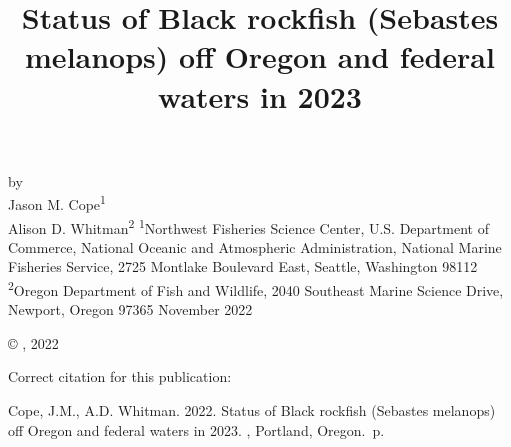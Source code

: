 \documentclass[11pt,
  english,
  letterpaper,
]{article}
\date{}
\newcommand{\trTitle}{Status of Black rockfish (Sebastes melanops) off Oregon and federal waters in 2023}
\newcommand{\trYear}{2022}
\newcommand{\trMonth}{November}
\newcommand{\trAuthsBack}{Cope, J.M., A.D. Whitman}
\newcommand{\trCitation}{
\begin{hangparas}{1em}{1}
\trAuthsBack{}. \trYear{}. \trTitle{}. \glsentrylong{pfmc}, Portland, Oregon. \pageref{LastPage}{}\,p.
\end{hangparas}}
\begin{document}

\renewcommand*{\thefootnote}{\fnsymbol{footnote}}

\small
\thispagestyle{empty}
\noindent
\begin{center}
\title{Status of Black rockfish (Sebastes melanops) off Oregon and federal waters in 2023}
\vspace{1.5cm}
{\Large\textbf{}}
\vfill
by\\
Jason M. Cope\textsuperscript{1}\\
Alison D. Whitman\textsuperscript{2}\vfill
\textsuperscript{1}Northwest Fisheries Science Center, U.S. Department of Commerce, National Oceanic and Atmospheric Administration, National Marine Fisheries Service, 2725 Montlake Boulevard East, Seattle, Washington 98112\\
\textsuperscript{2}Oregon Department of Fish and Wildlife, 2040 Southeast Marine Science Drive, Newport, Oregon 97365\vfill
\trMonth{} \trYear{}
\end{center}
\clearpage

\thispagestyle{empty}
\vspace*{\fill}
\begin{center}
\copyright{} , \trYear{}\\
\end{center}
\par
\bigskip
\noindent
Correct citation for this publication:
\bigskip
\par
\trCitation{}
\clearpage


\tableofcontents\clearpage
\label{TRlastRoman}
\clearpage

\newpage
\thispagestyle{empty} %

\pagestyle{plain}  %
\renewcommand*{\thefootnote}{\arabic{footnote}}  %
\setcounter{footnote}{0}  %
\renewcommand{\headrulewidth}{0.5pt}
\renewcommand{\footrulewidth}{0.5pt}
\end{document}
